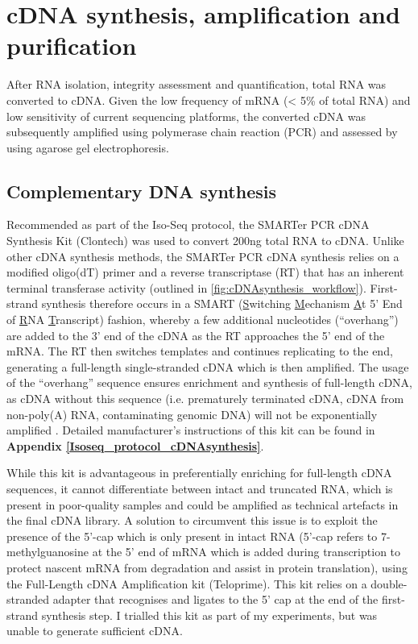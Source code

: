 \begin{figure}[htp]
	\label{fig:bionalayzer_pics}
\end{figure}

\newpage
\section{cDNA synthesis, amplification and purification}
After RNA isolation, integrity assessment and quantification, total RNA was converted to cDNA. Given the low frequency of mRNA (< 5\% of total RNA) and low sensitivity of current sequencing platforms, the converted cDNA was subsequently amplified using polymerase chain reaction (PCR) and assessed by using agarose gel electrophoresis. 


\subsection{Complementary DNA synthesis}
\label{section:ch2_cDNA_synthesis_explanation} 
Recommended as part of the Iso-Seq protocol, the SMARTer PCR cDNA Synthesis Kit (Clontech) was used to convert 200ng total RNA to cDNA. Unlike other cDNA synthesis methods, the SMARTer PCR cDNA synthesis relies on a modified oligo(dT) primer and a reverse transcriptase (RT) that has an inherent terminal transferase activity (outlined in \cref{fig:cDNAsynthesis_workflow}). First-strand synthesis therefore occurs in a SMART (\underline{S}witching \underline{M}echanism \underline{A}t 5' End of \underline{R}NA \underline{T}ranscript) fashion, whereby a few additional nucleotides (“overhang”) are added to the 3' end of the cDNA as the RT approaches the 5' end of the mRNA. The RT then switches templates and continues replicating to the end, generating a full-length single-stranded cDNA which is then amplified. The usage of the “overhang” sequence ensures enrichment and synthesis of full-length cDNA, as cDNA without this sequence (i.e. prematurely terminated cDNA, cDNA from non-poly(A) RNA, contaminating genomic DNA) will not be exponentially amplified \cite{Ramskold2012}. Detailed manufacturer's instructions of this kit can be found in \textbf{Appendix \ref{Isoseq_protocol_cDNAsynthesis}}. 

While this kit is advantageous in preferentially enriching for full-length cDNA sequences, it cannot differentiate between intact and truncated RNA, which is present in poor-quality samples and could be amplified as technical artefacts in the final cDNA library. A solution to circumvent this issue is to exploit the presence of the 5’-cap which is only present in intact RNA (5'-cap refers to 7-methylguanosine at the 5’ end of mRNA which is added during transcription to protect nascent mRNA from degradation and assist in protein translation), using the Full-Length cDNA Amplification kit (Teloprime)\cite{Cartolano2016}. This kit relies on a double-stranded adapter that recognises and ligates to the 5’ cap at the end of the first-strand synthesis step. I trialled this kit as part of my experiments, but was unable to generate sufficient cDNA. 

